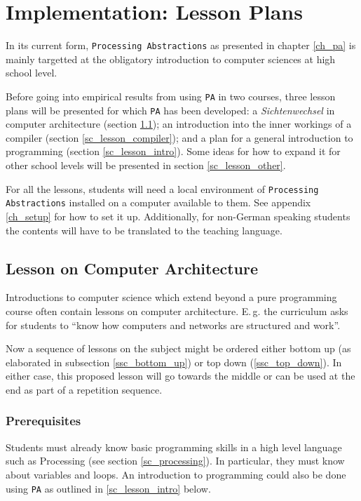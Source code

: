 
\chapter{Implementation: Lesson Plans} \label{ch_teaching}
In its current form, \texttt{Processing Abstractions} as presented in chapter \ref{ch_pa} is mainly targetted at the obligatory introduction to computer sciences at high school level.

Before going into empirical results from using \texttt{PA} in two courses, three lesson plans will be presented for which \texttt{PA} has been developed: a \emph{Sichtenwechsel} in computer architecture (section \ref{sc_lesson_ca}); an introduction into the inner workings of a compiler (section \ref{sc_lesson_compiler}); and a plan for a general introduction to programming (section \ref{sc_lesson_intro}). Some ideas for how to expand it for other school levels will be presented in section \ref{sc_lesson_other}.

For all the lessons, students will need a local environment of \texttt{Processing Abstractions} installed on a computer available to them. See appendix \ref{ch_setup} for how to set it up. Additionally, for non-German speaking students the contents will have to be translated to the teaching language.

\section{Lesson on Computer Architecture} \label{sc_lesson_ca}
Introductions to computer science which extend beyond a pure programming course often contain lessons on computer architecture. E.\,g. the curriculum \cite[p.\,145]{Erz16} asks for students to ``know how computers and networks are structured and work''.

Now a sequence of lessons on the subject might be ordered either bottom up (as elaborated in subsection \ref{ssc_bottom_up}) or top down (\ref{ssc_top_down}). In either case, this proposed lesson will go towards the middle or can be used at the end as part of a repetition sequence.

\subsection{Prerequisites}
Students must already know basic programming skills in a high level language such as Processing (see section \ref{sc_processing}). In particular, they must know about variables and loops. An introduction to programming could also be done using \texttt{PA} as outlined in \ref{sc_lesson_intro} below.

